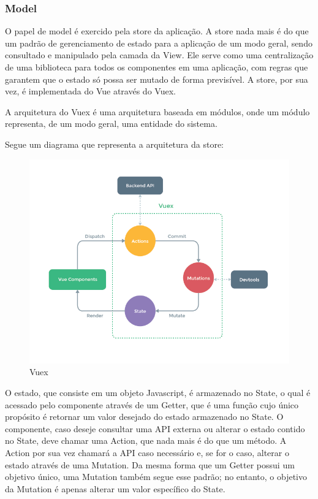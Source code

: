 \begin{apendicesenv}
\subsubsection{Model}
O papel de model é exercido pela store da aplicação. A store nada mais é do que um padrão de gerenciamento de estado para a aplicação de um modo geral, sendo consultado e manipulado pela camada da View. Ele serve como uma centralização de uma biblioteca para todos os componentes em uma aplicação, com regras que garantem que o estado só possa ser mutado de forma previsível. A store, por sua vez, é implementada do Vue através do Vuex.

A arquitetura do Vuex é uma arquitetura baseada em módulos, onde um módulo representa, de um modo geral, uma entidade do sistema.

Segue um diagrama que representa a arquitetura da store:

\begin{figure}[!ht]
	\centering
		\includegraphics[scale=0.5]{figuras/software/7-vuex.png}
	\caption{Vuex}
\end{figure}

O estado, que consiste em um objeto Javascript, é armazenado no State, o qual é acessado pelo componente através de um Getter, que é uma função cujo único propósito é retornar um valor desejado do estado armazenado no State. O componente, caso deseje consultar uma API externa ou alterar o estado contido no State, deve chamar uma Action, que nada mais é do que um método. A Action por sua vez chamará a API caso necessário e, se for o caso, alterar o estado através de uma Mutation. Da mesma forma que um Getter possui um objetivo único, uma Mutation também segue esse padrão; no entanto, o objetivo da Mutation é apenas alterar um valor específico do State. 


\end{apendicesenv}
